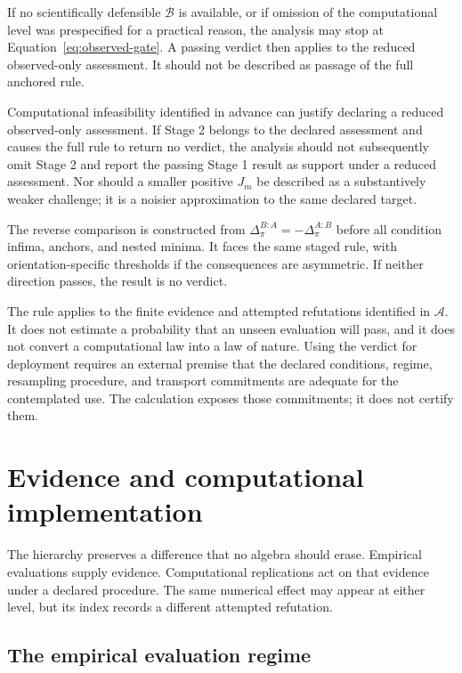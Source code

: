 \documentclass[11pt]{article}
\newcommand{\Assess}{\mathcal{A}}
\newcommand{\Boot}{\mathcal{B}}
\theoremstyle{remark}
\begin{document}
If no scientifically defensible $\Boot$ is available, or if omission of the
computational level was prespecified for a practical reason, the analysis may
stop at Equation~\eqref{eq:observed-gate}. A passing verdict then applies to
the reduced observed-only assessment. It should not be described as passage of
the full anchored rule.

Computational infeasibility identified in advance can justify declaring a
reduced observed-only assessment. If Stage 2 belongs to the declared
assessment and causes the full rule to return no verdict, the analysis should
not subsequently omit Stage 2 and report the passing Stage 1 result as support
under a reduced assessment. Nor should a smaller positive $J_m$ be described
as a substantively weaker challenge; it is a noisier approximation to the same
declared target.

The reverse comparison is constructed from
$\Delta^{B:A}_\pi=-\Delta^{A:B}_\pi$ before all condition infima, anchors,
and nested minima. It faces the same staged rule, with orientation-specific
thresholds if the consequences are asymmetric. If neither direction passes,
the result is no verdict.

The rule applies to the finite evidence and attempted refutations identified
in $\Assess$. It does not estimate a probability that an unseen
evaluation will pass, and it does not convert a computational law into a law of
nature. Using the verdict for deployment requires an external premise that the
declared conditions, regime, resampling procedure, and transport commitments
are adequate for the contemplated use. The calculation exposes those
commitments; it does not certify them.

\section{Evidence and computational implementation}
\label{sec:evidence}

The hierarchy preserves a difference that no algebra should erase. Empirical
evaluations supply evidence. Computational replications act on that evidence
under a declared procedure. The same numerical effect may appear at either
level, but its index records a different attempted refutation.

\subsection{The empirical evaluation regime}
\end{document}
